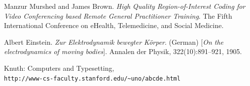 \documentclass[11pt]{article} %
\begin{document}
\begin{thebibliography}{9}
Manzur Murshed and James Brown. 
\textit{High Quality Region-of-Interest Coding for Video Conferencing based Remote General Practitioner Training}. 
The Fifth International Conference on eHealth, Telemedicine, and Social Medicine.
 
Albert Einstein. 
\textit{Zur Elektrodynamik bewegter K{\"o}rper}. (German) 
[\textit{On the electrodynamics of moving bodies}]. 
Annalen der Physik, 322(10):891–921, 1905.
 
Knuth: Computers and Typesetting,
\\\texttt{http://www-cs-faculty.stanford.edu/\~{}uno/abcde.html}
\end{thebibliography}
\end{document}
